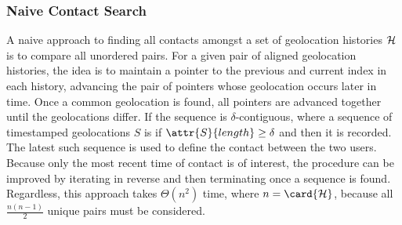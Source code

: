 \subsubsection{Naive Contact Search}\label{sec:naive-contact-search}
A naive approach to finding all contacts amongst a set of geolocation histories $\mathcal{H}$ is to compare all unordered pairs. For a given pair of aligned geolocation histories, the idea is to maintain a pointer to the previous and current index in each history, advancing the pair of pointers whose geolocation occurs later in time. Once a common geolocation is found, all pointers are advanced together until the geolocations differ. If the sequence is $\delta$-contiguous, where a sequence of timestamped geolocations $S$ is  if $\attr{S}{length} \geq \delta$ and
then it is recorded. The latest such sequence is used to define the contact between the two users. Because only the most recent time of contact is of interest, the procedure can be improved by iterating in reverse and then terminating once a sequence is found. Regardless, this approach takes $\Theta(n^2)$ time, where $n = \card{\histories}$, because all $\frac{n(n - 1)}{2}$ unique pairs must be considered.


